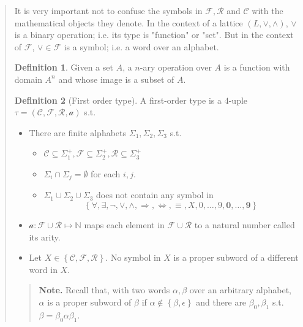 \documentclass[a4paper, 12pt]{article}
\theoremstyle{definition}
\theoremstyle{definition}
\theoremstyle{definition}
\newtheorem{definition}{Definition}
\begin{document}
\begin{quote}
\begin{quote}
\end{quote}
\normalsize

It is very important not to confuse the symbols in $\mathcal{F},\mathcal{R} $
and $\mathcal{C}$ with the mathematical objects they denote. In the context of
a lattice $(L, \lor, \land)$, $\lor$ is a binary operation; i.e. its type is
"function" or "set". But in the context of $\mathcal{F}$, $\lor  \in
\mathcal{F}$ is a symbol; i.e. a word over an alphabet.

\begin{definition}
    Given a set $A$, a $n$-ary operation over $A$ is a function with domain
    $A^n$ and whose image is a subset of $A$.
\end{definition}


\begin{definition}[First order type]
    A first-order type is a $4$-uple $\tau = \left( \mathcal{C}, \mathcal{F}, \mathcal{R}, \mathcal{a} \right) $ 
    s.t. 

    \begin{itemize}
        \item There are finite alphabets $\Sigma_1, \Sigma_2, \Sigma_3$ s.t. 
            \begin{itemize}
                \item $\mathcal{C} \subseteq \Sigma_1^{+}, \mathcal{F} \subseteq \Sigma_2^{+}, \mathcal{R} \subseteq \Sigma_3^+$
                \item $\Sigma_i \cap \Sigma_j = \emptyset$ for each $i, j$.
                \item $\Sigma_1 \cup \Sigma_2 \cup \Sigma_3$ does not contain 
                    any symbol in $$\left\{ \forall , \exists , \neg, \lor , \land , \Rightarrow, \iff, \equiv, X, 0,\ldots, 9, \textbf{0},\ldots, \textbf{9} \right\} $$
            \end{itemize}
        \item $\mathcal{a} : \mathcal{F} \cup \mathcal{R} \mapsto \mathbb{N}$ maps each element in $\mathcal{F} \cup \mathcal{R}$ to a natural number called its arity.
        \item Let $X \in \left\{ \mathcal{C}, \mathcal{F}, \mathcal{R} \right\} $. No symbol in $X$
            is a proper subword of a different word in $X$.
    \end{itemize}
\end{definition}


\small
\begin{quote}

\textbf{Note.} Recall that, with two words $\alpha, \beta$ over an arbitrary alphabet, 
$\alpha$ is a proper subword of $\beta$ if $\alpha \not\in \left\{ \beta, \epsilon \right\} $
and there are $\beta_0, \beta_1$ s.t. $\beta = \beta_0\alpha\beta_1$.


\end{quote}
\end{quote}
\end{document}
